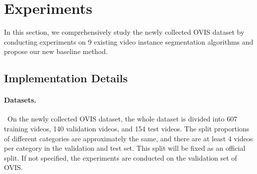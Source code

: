 \documentclass[twocolumn]{svjour3}          \smartqed  \usepackage{graphicx}
\begin{document}
\begin{sloppypar}
\section{Experiments} \label{section:experiment}
In this section, we comprehensively study the newly collected OVIS dataset by conducting experiments on 9 existing video instance segmentation algorithms and propose our new baseline method.
 
\subsection{Implementation Details}
\label{sec:implementation}

\paragraph{Datasets.}~On the newly collected OVIS dataset, the whole dataset is divided into 607 training videos, 140 validation videos, and 154 test videos. The split proportions of different categories are approximately the same, and there are at least 4 videos per category in the validation and test set. 
This split will be fixed as an official split. If not specified, the experiments are conducted on the validation set of OVIS.


\end{sloppypar}
\end{document}
